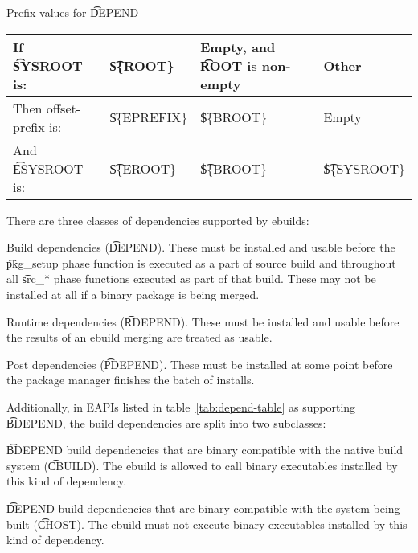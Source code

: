 \begin{centertable}{Prefix values for \t{DEPEND}}
    \label{tab:depend-prefix}
    \begin{tabular}{llll}
      \toprule
      If \t{SYSROOT} is:     & \t{\$\{ROOT\}}    & Empty, and \t{ROOT} is non-empty
                                                                   & Other             \\
      \midrule
      Then offset-prefix is: & \t{\$\{EPREFIX\}} & \t{\$\{BROOT\}} & Empty             \\
      And \t{ESYSROOT} is:   & \t{\$\{EROOT\}}   & \t{\$\{BROOT\}} & \t{\$\{SYSROOT\}} \\
      \bottomrule
    \end{tabular}
\end{centertable}

There are three classes of dependencies supported by ebuilds:

\begin{compactitem}
\item Build dependencies (\t{DEPEND}). These must be installed and usable before the \t{pkg_setup}
    phase function is executed as a part of source build and throughout all \t{src_*} phase
    functions executed as part of that build. These may not be installed at all if a binary package
    is being merged.
\item Runtime dependencies (\t{RDEPEND}). These must be installed and usable before
    the results of an ebuild merging are treated as usable.
\item Post dependencies (\t{PDEPEND}). These must be installed at some point before
    the package manager finishes the batch of installs.
\end{compactitem}

 Additionally, in EAPIs listed in table~\ref{tab:depend-table}
as supporting \t{BDEPEND}, the build dependencies are split into two subclasses:

\begin{compactitem}
\item \t{BDEPEND} build dependencies that are binary compatible with the native build system
    (\t{CBUILD}). The ebuild is allowed to call binary executables installed by this kind of
    dependency.
\item \t{DEPEND} build dependencies that are binary compatible with the system being built
    (\t{CHOST}). The ebuild must not execute binary executables installed by this kind of
    dependency.
\end{compactitem}

